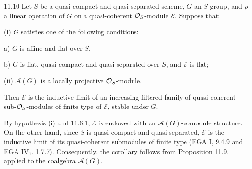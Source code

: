 \begin{corollary}{11.10}\label{VIB.11.10}
Let $S$ be a quasi-compact and quasi-separated scheme, $G$ an $S$-group, and $\rho$ a linear operation of $G$ on a quasi-coherent $\mathcal{O}_S$-module $\mathscr E$. Suppose that:

(i) $G$ satisfies one of the following conditions:

a) $G$ is affine and flat over $S$,

b) $G$ is flat, quasi-compact and quasi-separated over $S$, and $\mathscr E$ is flat;

(ii) $\mathscr A(G)$ is a locally projective $\mathcal{O}_S$-module.

Then $\mathscr E$ is the inductive limit of an increasing filtered family of quasi-coherent sub-$\mathcal{O}_S$-modules of finite type of $\mathscr E$, stable under $G$.
\end{corollary}
By hypothesis (i) and 11.6.1, $\mathscr E$ is endowed with an $\mathscr A(G)$-comodule structure. On the other hand, since $S$ is quasi-compact and quasi-separated, $\mathscr E$ is the inductive limit of its quasi-coherent submodules of finite type (EGA I, 9.4.9 and EGA IV$_1$, 1.7.7). Consequently, the corollary follows from Proposition 11.9, applied to the coalgebra $\mathscr A(G)$.

